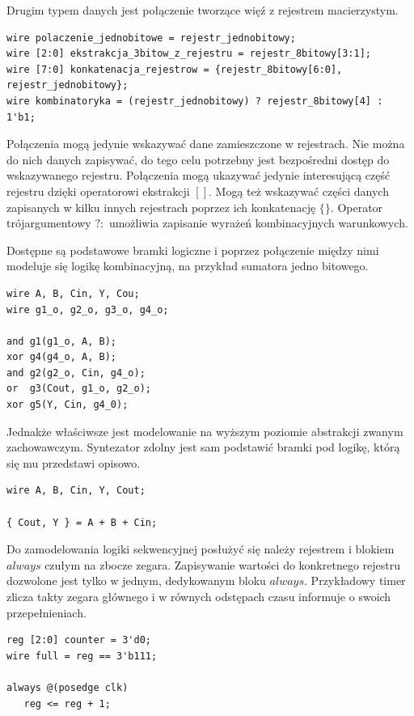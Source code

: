 \documentclass[a4paper,12pt]{article}
\begin{document}
Drugim typem danych jest połączenie tworzące więź z rejestrem macierzystym.
\begin{lstlisting}[label=reg,caption=Polaczenie]
wire polaczenie_jednobitowe = rejestr_jednobitowy;
wire [2:0] ekstrakcja_3bitow_z_rejestru = rejestr_8bitowy[3:1];
wire [7:0] konkatenacja_rejestrow = {rejestr_8bitowy[6:0], rejestr_jednobitowy};
wire kombinatoryka = (rejestr_jednobitowy) ? rejestr_8bitowy[4] : 1'b1;
\end{lstlisting}
Połączenia mogą jedynie wskazywać dane zamieszczone w rejestrach. Nie można do nich danych zapisywać, do tego celu potrzebny jest bezpośredni dostęp do wskazywanego rejestru. Połączenia mogą ukazywać jedynie interesującą część rejestru dzięki operatorowi ekstrakcji $[ ]$. Mogą też wskazywać części danych zapisanych w kilku innych rejestrach poprzez ich konkatenację $\{\}$. Operator trójargumentowy $? :$ umożliwia zapisanie wyrażeń kombinacyjnych warunkowych.

Dostępne są podstawowe bramki logiczne i poprzez połączenie między nimi modeluje się logikę kombinacyjną, na przykład sumatora jedno bitowego.
\begin{lstlisting}[label=Sum1,caption=Sum1.v]
wire A, B, Cin, Y, Cou;
wire g1_o, g2_o, g3_o, g4_o;

and g1(g1_o, A, B);
xor g4(g4_o, A, B);
and g2(g2_o, Cin, g4_o);
or  g3(Cout, g1_o, g2_o);
xor g5(Y, Cin, g4_0);
\end{lstlisting}

Jednakże właściwsze jest modelowanie na wyższym poziomie abstrakcji zwanym zachowawczym. Syntezator zdolny jest sam podstawić bramki pod logikę, którą się mu przedstawi opisowo.

\begin{lstlisting}[label=Sum1,caption=Sum1.v]
wire A, B, Cin, Y, Cout;

{ Cout, Y } = A + B + Cin;
\end{lstlisting}

Do zamodelowania logiki sekwencyjnej posłużyć się należy rejestrem i blokiem $always$ czułym na zbocze zegara. Zapisywanie wartości do konkretnego rejestru dozwolone jest tylko w jednym, dedykowanym bloku $always$. Przykładowy timer zlicza takty zegara głównego i w równych odstępach czasu informuje o swoich przepełnieniach.
\begin{lstlisting}[label=Timer,caption=Timer.v]
reg [2:0] counter = 3'd0;
wire full = reg == 3'b111;

always @(posedge clk)
   reg <= reg + 1;
\end{lstlisting}
\end{document}
